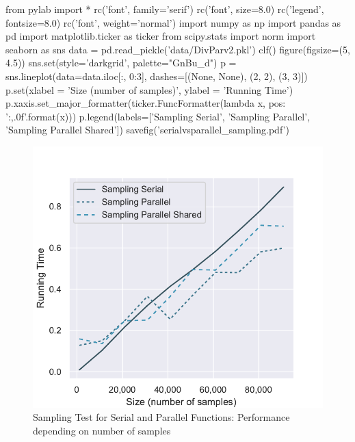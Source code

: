\documentclass[11pt]{article}
\begin{document}
\begin{pycode}
from pylab import *
rc('font', family='serif')
rc('font', size=8.0)
rc('legend', fontsize=8.0)
rc('font', weight='normal')
import numpy as np
import pandas as pd
import matplotlib.ticker as ticker
from scipy.stats import norm
import seaborn as sns
data = pd.read_pickle('data/DivParv2.pkl')
clf()
figure(figsize=(5, 4.5))
sns.set(style='darkgrid', palette="GnBu_d")
p = sns.lineplot(data=data.iloc[:, 0:3], dashes=[(None, None), (2, 2), (3, 3)])
p.set(xlabel = 'Size (number of samples)', ylabel = 'Running Time')
p.xaxis.set_major_formatter(ticker.FuncFormatter(lambda x, pos: '{:,.0f}'.format(x)))
p.legend(labels=['Sampling Serial', 'Sampling Parallel', 'Sampling Parallel Shared'])
savefig('serialvsparallel_sampling.pdf')
\end{pycode}

\begin{figure}[H]
    \begin{center}
        \includegraphics{serialvsparallel_sampling.pdf}
    \end{center}
    \caption{Sampling Test for Serial and Parallel Functions: Performance depending on number of samples}\label{fig:Sampling    Test}
\end{figure}

\printbibliography
\end{document}
